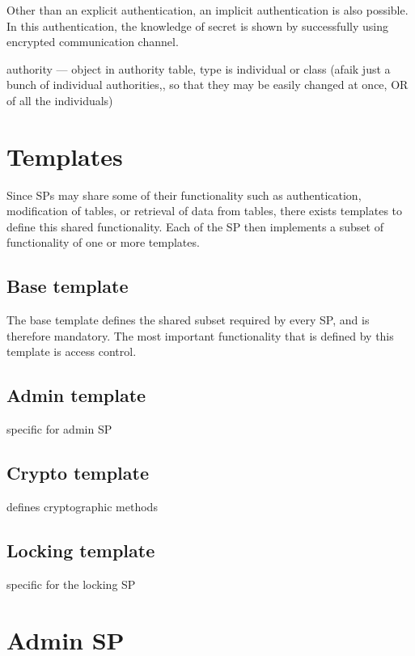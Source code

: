 
Other than an explicit authentication, an implicit authentication is also possible. In this authentication, the knowledge of secret is shown by successfully using encrypted communication channel.

authority --- object in authority table, type is individual or class (afaik just a bunch of individual authorities,, so that they may be easily changed at once, OR of all the individuals)


\section{Templates}

Since SPs may share some of their functionality such as authentication, modification of tables, or retrieval of data from tables, there exists templates to define this shared functionality. Each of the SP then implements a subset of functionality of one or more templates.

\subsection{Base template}

The base template defines the shared subset required by every SP, and is therefore mandatory. The most important functionality that is defined by this template is access control.

\subsection{Admin template}

specific for admin SP

\subsection{Crypto template}

defines cryptographic methods

\subsection{Locking template}

specific for the locking SP

\section{Admin SP}

